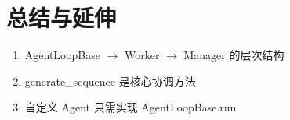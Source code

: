 \section{总结与延伸}
\begin{enumerate}
  \item AgentLoopBase $\to$ Worker $\to$ Manager 的层次结构
  \item generate\_sequence 是核心协调方法
  \item 自定义 Agent 只需实现 AgentLoopBase.run
\end{enumerate}

